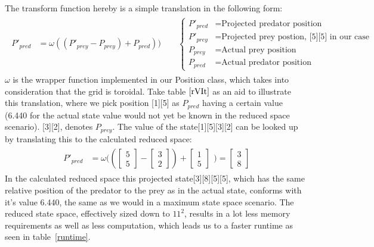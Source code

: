 \documentclass[paper=a4, fontsize=11pt]{scrartcl}
\numberwithin{equation}{section}		%
\numberwithin{figure}{section}			%
\numberwithin{table}{section}				%
\begin{document}
\indent The transform function hereby is a simple translation in the following form:
\begin{align}
\begin{split}
P'_{pred} &= \omega((P'_{prey}-P_{prey})+P_{pred}))
\qquad
\begin{cases}
P'_{pred} &= \text{Projected predator position} \\
P'_{prey} &= \text{Projected prey postion, [5][5] in our case} \\
P_{prey} &= \text{Actual prey position} \\
P_{pred} &= \text{Actual predator position}
\end{cases}
\end{split}
\end{align}
$\omega$ is the wrapper function implemented in our Position class, which takes into consideration that the grid is toroidal. 
Take table $\ref{rVIt}$ as an aid to illustrate this translation, where we pick position [1][5] as $P_{pred}$ having a certain value (6.440 for the actual state value would not yet be known in the reduced space scenario). [3][2], denotes $P_{prey}$. The value of the state[1][5][3][2] can be looked up by translating this to the calculated reduced space:
\begin{align}
\begin{split}
P'_{pred}
&=\omega((\begin{bmatrix} 
5 \\
5
\end{bmatrix} -
\begin{bmatrix}
3 \\
2
\end{bmatrix} )+
\begin{bmatrix}
1 \\
5
\end{bmatrix}
\end{split})
=
\begin{bmatrix}
3 \\
8
\end{bmatrix}
\end{align}
In the calculated reduced space this projected state[3][8][5][5], which has the same relative position of the predator to the prey as in the actual state, conforms with it's value 6.440, the same as we would in a maximum state space scenario. The reduced state space, effectively sized down to $11^2$, results in a lot less memory requirements as well as less computation, which leads us to a faster runtime as seen in table~\ref{runtime}. 
\end{document}
